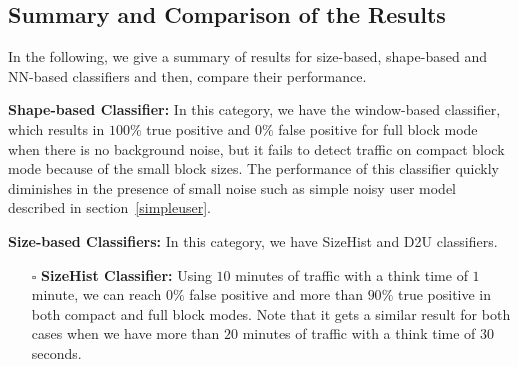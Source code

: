\subsection{Summary and Comparison of the Results}
 In the following, we give a summary of results for size-based, shape-based and NN-based classifiers and then, compare their performance.
\begin{compactitem}
\item \textbf{Shape-based Classifier:} In this category, we have the window-based classifier, which results in $100\%$ true positive and $0\%$ false positive for full block mode when there is no background noise, but it fails to detect \bc traffic on compact block mode because of the small block sizes. The performance of this classifier quickly diminishes in the presence of small noise such as simple noisy user model described in section~\ref{simpleuser}.
\item \textbf{Size-based Classifiers:} 
In this category, we have SizeHist and D2U classifiers.
\begin{itemize}
\item[$\square$] \textbf{SizeHist Classifier:}
Using $10$ minutes of traffic with a think time of $1$ minute, we can reach $0\%$ false positive and more than $90\%$ true positive in both compact and full block modes. Note that it gets a similar result for both cases when we have more than $20$ minutes of 
traffic with a think time of $30$ seconds. 




\end{itemize}
\end{compactitem}
